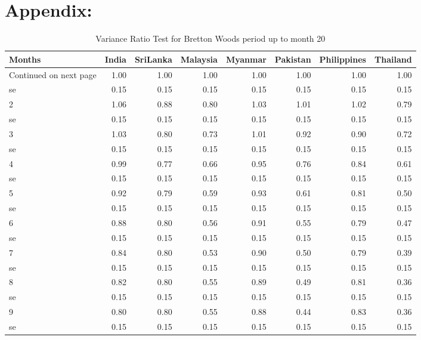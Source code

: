 \documentclass[11pt,preprint, authoryear]{elsarticle}
\numberwithin{equation}{section}
\numberwithin{figure}{section}
\numberwithin{table}{section}
\begin{document}
\newpage

\hypertarget{appendix}{%
\section*{\texorpdfstring{Appendix:
\label{A}}{Appendix: }}\label{appendix}}

\begingroup\fontsize{12pt}{13pt}\selectfont
\begin{longtable}{lrrrrrrr}
\caption{Variance Ratio Test for Bretton Woods period up to month 20} \\ 
  \toprule
Months & India & SriLanka & Malaysia & Myanmar & Pakistan & Philippines & Thailand \\ 
  \hline 
\endhead 
\hline 
{\footnotesize Continued on next page} 
\endfoot 
\endlastfoot 
 \midrule
1 & 1.00 & 1.00 & 1.00 & 1.00 & 1.00 & 1.00 & 1.00 \\ 
  se & 0.15 & 0.15 & 0.15 & 0.15 & 0.15 & 0.15 & 0.15 \\ 
  2 & 1.06 & 0.88 & 0.80 & 1.03 & 1.01 & 1.02 & 0.79 \\ 
  se & 0.15 & 0.15 & 0.15 & 0.15 & 0.15 & 0.15 & 0.15 \\ 
  3 & 1.03 & 0.80 & 0.73 & 1.01 & 0.92 & 0.90 & 0.72 \\ 
  se & 0.15 & 0.15 & 0.15 & 0.15 & 0.15 & 0.15 & 0.15 \\ 
  4 & 0.99 & 0.77 & 0.66 & 0.95 & 0.76 & 0.84 & 0.61 \\ 
  se & 0.15 & 0.15 & 0.15 & 0.15 & 0.15 & 0.15 & 0.15 \\ 
  5 & 0.92 & 0.79 & 0.59 & 0.93 & 0.61 & 0.81 & 0.50 \\ 
  se & 0.15 & 0.15 & 0.15 & 0.15 & 0.15 & 0.15 & 0.15 \\ 
  6 & 0.88 & 0.80 & 0.56 & 0.91 & 0.55 & 0.79 & 0.47 \\ 
  se & 0.15 & 0.15 & 0.15 & 0.15 & 0.15 & 0.15 & 0.15 \\ 
  7 & 0.84 & 0.80 & 0.53 & 0.90 & 0.50 & 0.79 & 0.39 \\ 
  se & 0.15 & 0.15 & 0.15 & 0.15 & 0.15 & 0.15 & 0.15 \\ 
  8 & 0.82 & 0.80 & 0.55 & 0.89 & 0.49 & 0.81 & 0.36 \\ 
  se & 0.15 & 0.15 & 0.15 & 0.15 & 0.15 & 0.15 & 0.15 \\ 
  9 & 0.80 & 0.80 & 0.55 & 0.88 & 0.44 & 0.83 & 0.36 \\ 
  se & 0.15 & 0.15 & 0.15 & 0.15 & 0.15 & 0.15 & 0.15 \\ 

\end{longtable}
\end{document}
